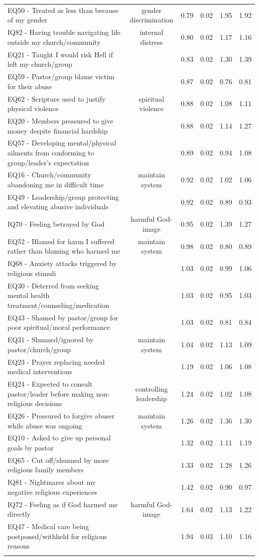 \documentclass[
  letterpaper,
]{article}
\begin{document}
\begin{longtable}[t]{>{\raggedright\arraybackslash}p{11cm}ccccc}
EQ50 - Treated as less than because of my gender & gender discrimination & 0.79 & 0.02 & 1.95 & 1.92\\
*IQ82 - Having trouble navigating life outside my church/community & internal distress & 0.80 & 0.02 & 1.17 & 1.16\\
EQ21 - Taught I would risk Hell if left my church/group &  & 0.83 & 0.02 & 1.30 & 1.39\\
\addlinespace
EQ59 - Pastor/group blame victim for their abuse &  & 0.87 & 0.02 & 0.76 & 0.81\\
*EQ62 - Scripture used to justify physical violence & spiritual violence & 0.88 & 0.02 & 1.08 & 1.11\\
EQ20 - Members pressured to give money despite financial hardship &  & 0.88 & 0.02 & 1.14 & 1.27\\
EQ57 - Developing mental/physical ailments from conforming to group/leader’s expectation &  & 0.89 & 0.02 & 0.94 & 1.08\\
*EQ16 - Church/community abandoning me in difficult time & maintain system & 0.92 & 0.02 & 1.02 & 1.06\\
\addlinespace
EQ49 - Leadership/group protecting and elevating abusive individuals &  & 0.92 & 0.02 & 0.89 & 0.93\\
*IQ70 - Feeling betrayed by God & harmful God-image & 0.95 & 0.02 & 1.39 & 1.27\\
*EQ52 - Blamed for harm I suffered rather than blaming who harmed me & maintain system & 0.98 & 0.02 & 0.80 & 0.89\\
IQ68 - Anxiety attacks triggered by religious stimuli &  & 1.03 & 0.02 & 0.99 & 1.06\\
EQ30 - Deterred from seeking mental health treatment/counseling/medication &  & 1.03 & 0.02 & 0.95 & 1.03\\
\addlinespace
EQ43 - Shamed by pastor/group for poor spiritual/moral performance &  & 1.03 & 0.02 & 0.81 & 0.84\\
*EQ31 - Shunned/ignored by pastor/church/group & maintain system & 1.04 & 0.02 & 1.13 & 1.09\\
EQ23 - Prayer replacing needed medical interventions &  & 1.19 & 0.02 & 1.06 & 1.08\\
*EQ24 - Expected to consult pastor/leader before making non-religious decisions & controlling leadership & 1.24 & 0.02 & 1.02 & 1.08\\
*EQ26 - Pressured to forgive abuser while abuse was ongoing & maintain system & 1.26 & 0.02 & 1.36 & 1.30\\
\addlinespace
EQ10 - Asked to give up personal goals by pastor &  & 1.32 & 0.02 & 1.11 & 1.19\\
EQ65 - Cut off/shunned by more religious family members &  & 1.33 & 0.02 & 1.28 & 1.26\\
IQ81 - Nightmares about my negative religious experiences &  & 1.42 & 0.02 & 0.90 & 0.97\\
*IQ72 - Feeling as if God harmed me directly & harmful God-image & 1.64 & 0.02 & 1.13 & 1.22\\
EQ47 - Medical care being postponed/withheld for religious reasons &  & 1.94 & 0.03 & 1.10 & 1.16\\*


\end{longtable}
\end{document}
